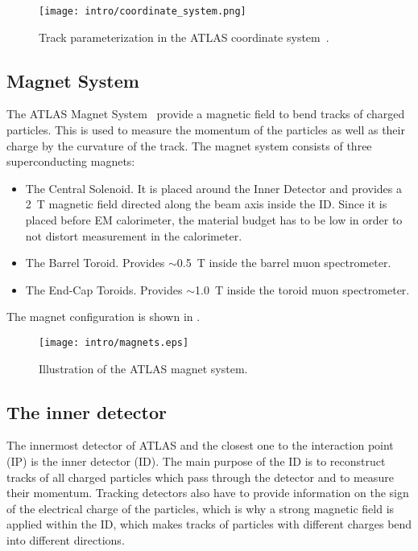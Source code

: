 \begin{figure}[]
  \centering
\texttt{[image: intro/coordinate\_system.png]}
\caption{Track parameterization in the ATLAS coordinate system~\cite{Cornelissen:2007aca}.}
\label{fig:coordinate_system}
\end{figure}

\subsection{Magnet System}
The ATLAS Magnet System~\cite{tdr_magnet} provide a magnetic field to bend tracks of charged particles. This is used to measure the momentum of the particles as well as their charge by the curvature of the track.
The magnet system consists of three superconducting magnets:
\begin{itemize}
 \item The Central Solenoid. It is placed around the Inner Detector and provides a 2~T magnetic field directed along the beam axis inside the ID. 
 Since it is placed before EM calorimeter, the material budget has to be low 
 in order to not distort measurement in the calorimeter.
 \item The Barrel Toroid. Provides $\sim$0.5~T inside the barrel muon spectrometer.
 \item The End-Cap Toroids. Provides $\sim$1.0~T inside the toroid muon spectrometer.
\end{itemize}
The magnet configuration is shown in .

\begin{figure}[]
  \centering
\texttt{[image: intro/magnets.eps]}
\caption{Illustration of the ATLAS magnet system.}
\label{fig:atlas_magnets}
\end{figure}

\subsection{The inner detector}
\label{sec:ID}

The innermost detector of ATLAS and the closest one to the interaction point (IP) is the inner detector (ID).
The main purpose of the ID is to reconstruct tracks of all charged particles which pass through the detector and to measure their momentum.
Tracking detectors also have to provide information on the sign of the electrical charge of the particles, 
which is why a strong magnetic field is applied within the ID, 
which makes tracks of particles with different charges bend into different directions.

